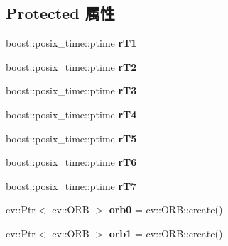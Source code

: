 \subsection*{Protected 属性}
\begin{DoxyCompactItemize}
\item 
\mbox{\label{classov__core_1_1TrackDescriptor_a8f3173b664e11dda898fda7d5ba46b71}} 
boost\+::posix\+\_\+time\+::ptime {\bfseries r\+T1}
\item 
\mbox{\label{classov__core_1_1TrackDescriptor_a4c41176773ce2a6545f2f8e4f85a1f7b}} 
boost\+::posix\+\_\+time\+::ptime {\bfseries r\+T2}
\item 
\mbox{\label{classov__core_1_1TrackDescriptor_a9d95fac250a57212caec71b5f5ad8aca}} 
boost\+::posix\+\_\+time\+::ptime {\bfseries r\+T3}
\item 
\mbox{\label{classov__core_1_1TrackDescriptor_ab14bc7cb2ca403d568109d52070cf081}} 
boost\+::posix\+\_\+time\+::ptime {\bfseries r\+T4}
\item 
\mbox{\label{classov__core_1_1TrackDescriptor_ad7263a9b3c359a3009c02ba5184a3090}} 
boost\+::posix\+\_\+time\+::ptime {\bfseries r\+T5}
\item 
\mbox{\label{classov__core_1_1TrackDescriptor_ae5bc6307841a28a9b3d8496b2fa6e073}} 
boost\+::posix\+\_\+time\+::ptime {\bfseries r\+T6}
\item 
\mbox{\label{classov__core_1_1TrackDescriptor_aa18bcb26c70ba3d269e7e171ada7eab3}} 
boost\+::posix\+\_\+time\+::ptime {\bfseries r\+T7}
\item 
\mbox{\label{classov__core_1_1TrackDescriptor_ad11366d838ae47600500543a56b651c3}} 
cv\+::\+Ptr$<$ cv\+::\+O\+RB $>$ {\bfseries orb0} = cv\+::\+O\+R\+B\+::create()
\item 
\mbox{\label{classov__core_1_1TrackDescriptor_aa7c9211e95e5e3e3b8fbeef4795ffdb9}} 
cv\+::\+Ptr$<$ cv\+::\+O\+RB $>$ {\bfseries orb1} = cv\+::\+O\+R\+B\+::create()

\end{DoxyCompactItemize}
